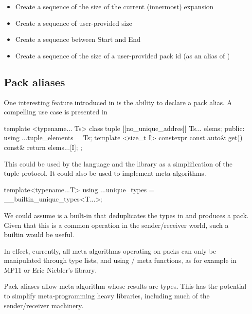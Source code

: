 \documentclass{wg21}
\begin{document}
\begin{itemize}
\item Create a sequence of the size of the current (innermost) expansion
\item Create a sequence of user-provided size 
\item Create a sequence between Start and End
\item Create a sequence of the size of a user-provided pack id (as an alias of )
\end{itemize}


\subsection{Pack aliases}
\label{sec:packaliases}

One interesting feature introduced in  is the ability to declare a pack alias.
A compelling use case is presented in 

\begin{colorblock}
    template <typename... Ts>
    class tuple {
        [[no_unique_addres]] Ts... elems;
    public:
        using ...tuple_elements = Ts;
        template <size_t I>
        constexpr const auto& get() const& {
            return elems...[I];
        }
    };
\end{colorblock}

This could be used by the language and the library as a simplification of the tuple protocol.
It could also be used to implement meta-algorithms.

\begin{colorblock}
    template<typename...T>
    using ...unique_types = __builtin_unique_types<T...>;
\end{colorblock}

We could assume  is a built-in that deduplicates the types in  and produces a pack.
Given that this is a common operation in the sender/receiver world, such a builtin would be useful.

In effect, currently, all meta algorithms operating on packs can only be manipulated through type lists,
and using / meta functions, as for example in MP11 or Eric Niebler's  library.

Pack aliases allow meta-algorithm whose results are types.
This has the potential to simplify meta-programming heavy libraries, including much of the sender/receiver machinery.
\end{document}
